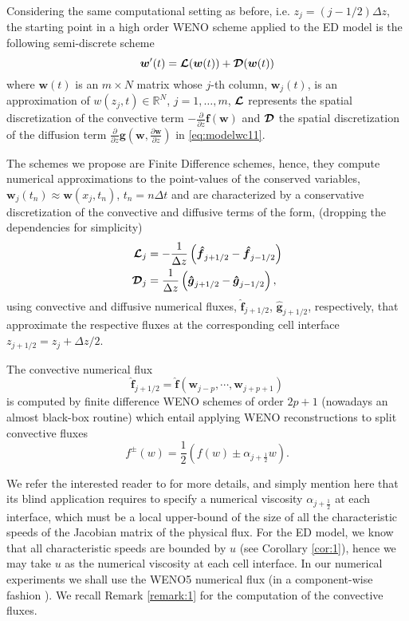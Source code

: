 \documentclass[preprint]{elsarticle}
\theoremstyle{definition}
\newcommand{\bw}{\boldsymbol w}
\newcommand{\bfj}{\boldsymbol{\hat f}}
\def\boc#1{\boldsymbol{{\cal #1}}}
\def\mD{\boc{D}}
\begin{document}
Considering the
same computational setting as before, i.e. $z_j=(j-1/2)\Delta z$,
the starting point in  a
high order 
WENO scheme applied to the ED model is the following   semi-discrete scheme
\begin{equation} \label{eq:weno-sd}
\boldsymbol{w}'(t)=\boldsymbol{{\cal{L}}}(\bw(t))+
\boldsymbol{{\mD}}(\bw(t))
\end{equation}
where $\bw(t)$ is an $m\times N$ matrix whose $j$-th column,
  $\bw_j(t)$, is an approximation of $ w(z_j, 
  t)\in\mathbb R^N$, $j=1,\dots,m$,
 $\boldsymbol{{\cal{L}}}$ represents the spatial discretization of the
convective term $-\frac{\partial}{\partial
  z} \boldsymbol{f}(\bw)$ and $\boldsymbol{{\mD}}$ the spatial
discretization of the diffusion term $\frac{\partial }{\partial
  z}\boldsymbol{g}\left(\bw,
  \frac{\partial \bw}{\partial z}\right)$ in
\eqref{eq:modelwc11}.

The schemes we propose are Finite Difference
schemes, hence, they compute numerical 
approximations to the point-values of the conserved variables,
$\bw_j(t_n)\approx \bw(x_j,t_n)$, $t_n = n \Delta t$ and are
characterized by a conservative discretization of the convective and
diffusive terms
of the form, (dropping the dependencies for simplicity)
\begin{align*}
\boldsymbol{{\cal L}}_j &= -\frac{1}{\Delta z} \left(
  \boldsymbol{\hat{{f}}}_{j+1/2}-\boldsymbol{\hat{{f}}}_{j-1/2}\right)\\
\boldsymbol{{\cal D}}_j &= \frac{1}{\Delta z} \left(
  \boldsymbol{\hat{{g}}}_{j+1/2}-\boldsymbol{\hat{{g}}}_{j-1/2}\right),
\end{align*}
using convective and diffusive numerical fluxes,
  $\boldsymbol{\hat{{f}}}_{j+1/2}$, $\boldsymbol{\hat{{g}}}_{j+1/2}$,
  respectively, that approximate the respective fluxes at the
  corresponding cell interface $z_{j+1/2}=z_j+\Delta z/2$.

The convective numerical flux
\begin{equation}\label{eq:203}
  \bfj_{j+1/2}=\bfj(\bw_{j-p},\cdots,\bw_{j+p+1})
\end{equation}  
is computed by finite
difference WENO schemes of order $2p+1$
(nowadays an almost black-box routine)
which entail  applying WENO reconstructions to split convective fluxes
\begin{equation*}
  f^{\pm}(w)=\frac{1}{2}\left(f(w)\pm \alpha_{j+\frac{1}{2}} w\right).
\end{equation*}  

We refer the interested reader to \cite{Shu2009} for more details, and simply mention here that
its blind application requires to specify a numerical viscosity
$\alpha_{j+\frac{1}{2}}$ at each
interface, which must be a local upper-bound of the size of all  the
characteristic speeds of the Jacobian matrix of the physical flux. For
the ED model, we know that all characteristic speeds are bounded by
$u$ (see Corollary \ref{cor:1}), hence we may take $u$ as the numerical viscosity at each
cell interface. In our numerical experiments we shall use the  WENO5 
numerical flux (in a  
component-wise fashion \cite{Shu2009}). We recall
  Remark \ref{remark:1} for the computation of the convective fluxes.
\end{document}
